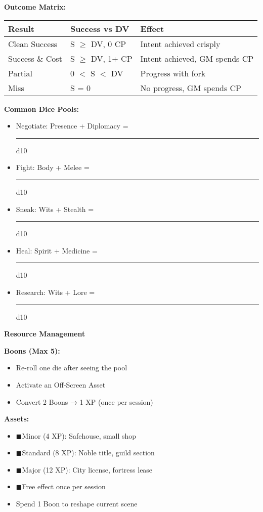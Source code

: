 \documentclass[10pt]{article}
\newcommand{\boon}{\textcolor{orange}{\ding{72}}}
\newcommand{\asset}{\textcolor{green!60!black}{$\blacksquare$}}
\begin{document}
\begin{mdframed}[backgroundcolor=background, linewidth=0pt]
\begin{adjustwidth}{0.2cm}{0.2cm}
\textbf{Outcome Matrix:}
\begin{center}
\begin{tabular}{|l|l|l|}
\hline
\cellcolor{lightaccent} \textbf{Result} & \cellcolor{lightaccent} \textbf{Success vs DV} & \cellcolor{lightaccent} \textbf{Effect} \\
\hline
Clean Success & S $\geq$ DV, 0 CP & Intent achieved crisply \\
Success \& Cost & S $\geq$ DV, 1+ CP & Intent achieved, GM spends CP \\
Partial & 0 $<$ S $<$ DV & Progress with fork \\
Miss & S = 0 & No progress, GM spends CP \\
\hline
\end{tabular}
\end{center}

\textbf{Common Dice Pools:}
\begin{itemize}[leftmargin=*]
\item Negotiate: Presence + Diplomacy = \rule{2cm}{0.4pt} d10
\item Fight: Body + Melee = \rule{2cm}{0.4pt} d10
\item Sneak: Wits + Stealth = \rule{2cm}{0.4pt} d10
\item Heal: Spirit + Medicine = \rule{2cm}{0.4pt} d10
\item Research: Wits + Lore = \rule{2cm}{0.4pt} d10
\end{itemize}
\end{adjustwidth}

\vspace{0.3cm}

\begin{mdframed}[backgroundcolor=sectionbg, linewidth=1pt, linecolor=accentcolor]
\textbf{\large Resource Management}
\end{mdframed}

\begin{adjustwidth}{0.2cm}{0.2cm}
\vspace{0.2cm}
\textbf{Boons (Max 5):}
\begin{itemize}[leftmargin=*]
\item \boon Re-roll one die after seeing the pool
\item \boon Activate an Off-Screen Asset
\item \boon Convert 2 Boons → 1 XP (once per session)
\end{itemize}

\textbf{Assets:}
\begin{itemize}[leftmargin=*]
\item \asset Minor (4 XP): Safehouse, small shop
\item \asset Standard (8 XP): Noble title, guild section
\item \asset Major (12 XP): City license, fortress lease
\item \asset Free effect once per session
\item Spend 1 Boon to reshape current scene
\end{itemize}


\end{adjustwidth}
\end{mdframed}
\end{document}

